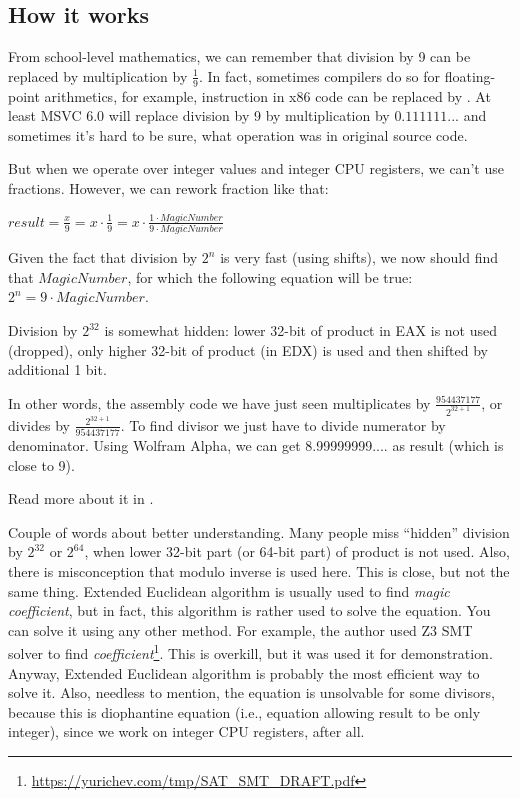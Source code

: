﻿\subsection{How it works}

From school-level mathematics, we can remember that division by 9 can be replaced by multiplication by $\frac{1}{9}$.
In fact, sometimes compilers do so for floating-point arithmetics, for example,  instruction in x86 code
can be replaced by .
At least MSVC 6.0 will replace division by 9 by multiplication by $0.111111...$ and sometimes it's hard to be sure,
what operation was in original source code.

But when we operate over integer values and integer CPU registers, we can't use fractions.
However, we can rework fraction like that:

\begin{center}
$result = \frac{x}{9} = x \cdot \frac{1}{9} = x \cdot \frac{1 \cdot MagicNumber}{9 \cdot MagicNumber}$
\end{center}

Given the fact that division by $2^n$ is very fast (using shifts), we now should find that $MagicNumber$,
for which the following
equation will be true: $2^n = 9 \cdot MagicNumber$.

Division by $2^{32}$ is somewhat hidden: lower 32-bit of product in EAX is not used (dropped), only higher 32-bit of
product (in EDX) is used and then shifted by additional 1 bit.

In other words, the assembly code we have just seen multiplicates by {\Large $\frac{954437177}{2^{32+1}}$},
or divides by {\Large $\frac{2^{32+1}}{954437177}$}.
To find divisor we just have to divide numerator by denominator.
Using Wolfram Alpha, we can get 8.99999999.... as result (which is close to 9).


Read more about it in .

Couple of words about better understanding.
Many people miss ``hidden'' division by $2^{32}$ or $2^{64}$,
when lower 32-bit part (or 64-bit part) of product is not used.
Also, there is misconception that modulo inverse is used here. This is close, but not the same thing.
Extended Euclidean algorithm is usually used to find \textit{magic coefficient}, but in fact,
this algorithm is rather used to solve the equation. You can solve it using any other method.
For example, the author used Z3 SMT solver to find \textit{coefficient}\footnote{\url{https://yurichev.com/tmp/SAT_SMT_DRAFT.pdf}}.
This is overkill, but it was used it for demonstration.
Anyway, Extended Euclidean algorithm is probably the most efficient way to solve it.
Also, needless to mention, the equation is unsolvable for some divisors, because this is diophantine equation
(i.e., equation allowing result to be only integer), since we work on integer CPU registers, after all.

